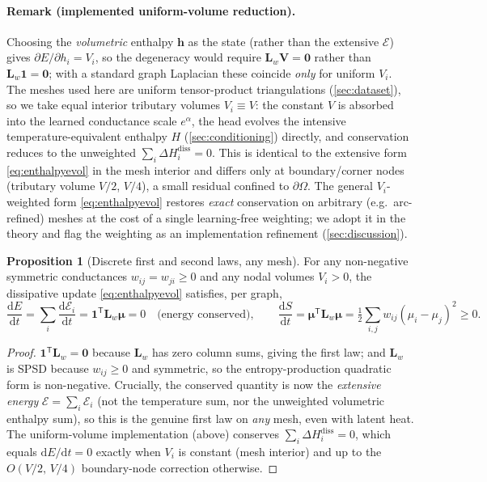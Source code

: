 \documentclass[11pt]{article}
\newcommand{\dd}{\mathrm{d}}
\newcommand{\T}{\mathsf{T}}                 %
\newcommand{\Lw}{\bm{L}_{\!w}}
\newcommand{\bmu}{\bm{\mu}}
\theoremstyle{definition}
\newtheorem{proposition}{Proposition}
\begin{document}
\paragraph{Remark (implemented uniform-volume reduction).}
Choosing the \emph{volumetric} enthalpy $\bm h$ as the state (rather than the extensive
$\bm{\mathcal E}$) gives $\partial E/\partial h_i=V_i$, so the degeneracy would require
$\Lw\bm V=\bm 0$ rather than $\Lw\bm 1=\bm 0$; with a standard graph Laplacian these
coincide \emph{only} for uniform $V_i$. The meshes used here are uniform tensor-product
triangulations (\cref{sec:dataset}), so we take equal interior tributary volumes
$V_i\equiv V$: the constant $V$ is absorbed into the learned conductance scale
$e^{\alpha}$, the head evolves the intensive temperature-equivalent enthalpy $H$
(\cref{sec:conditioning}) directly, and conservation reduces to the unweighted
$\sum_i\Delta H_i^{\mathrm{diss}}=0$. This is identical to the extensive form
\cref{eq:enthalpyevol} in the mesh interior and differs only at boundary/corner nodes
(tributary volume $V/2$, $V/4$), a small residual confined to $\partial\Omega$. The
general $V_i$-weighted form \cref{eq:enthalpyevol} restores \emph{exact} conservation on
arbitrary (e.g.\ arc-refined) meshes at the cost of a single learning-free weighting;
we adopt it in the theory and flag the weighting as an implementation refinement
(\cref{sec:discussion}).

\begin{proposition}[Discrete first and second laws, any mesh]
\label{prop1}
For any non-negative symmetric conductances $w_{ij}=w_{ji}\ge 0$ and any nodal volumes
$V_i>0$, the dissipative update \cref{eq:enthalpyevol} satisfies, per graph,
\begin{equation}
  \frac{\dd E}{\dd t}=\sum_i \frac{\dd \mathcal E_i}{\dd t}
    = \bm 1^\T \Lw\bmu = 0
  \quad\text{(energy conserved)},
  \qquad
  \frac{\dd S}{\dd t}=\bmu^\T\Lw\bmu
  = \tfrac12\sum_{i,j} w_{ij}(\mu_i-\mu_j)^2 \ge 0.
\end{equation}
\end{proposition}
\begin{proof}
$\bm1^\T\Lw=\bm0$ because $\Lw$ has zero column sums, giving the first law; and $\Lw$ is
SPSD because $w_{ij}\ge0$ and symmetric, so the entropy-production quadratic form is
non-negative. Crucially, the conserved quantity is now the \emph{extensive energy}
$\mathcal E=\sum_i\mathcal E_i$ (not the temperature sum, nor the unweighted volumetric
enthalpy sum), so this is the genuine first law on \emph{any} mesh, even with latent
heat. The uniform-volume implementation (above) conserves $\sum_i\Delta
H_i^{\mathrm{diss}}=0$, which equals $\dd E/\dd t=0$ exactly when $V_i$ is constant (mesh
interior) and up to the $O(V/2,\,V/4)$ boundary-node correction otherwise.
\end{proof}
\end{document}

